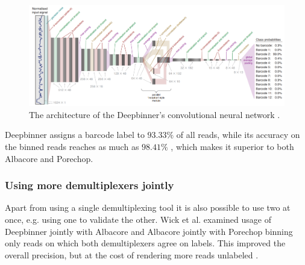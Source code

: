 \begin{figure}
    \centering
    \includegraphics[width=\textwidth]{images/deepbinner_cnn.png}
    \caption[Deepbinner's CNN architecture]{The architecture of the Deepbinner's convolutional neural network \cite{Deepbinner}.}
    \label{fig:deepbinner_cnn}
\end{figure}

Deepbinner assigns a barcode label to $93.33\%$ of all reads, while its accuracy on the binned reads reaches as much as $98.41\%$ \cite{Deepbinner}, which makes it superior to both Albacore and Porechop.

\subsubsection{Using more demultiplexers jointly}
Apart from using a single demultiplexing tool it is also possible to use two at once, e.g. using one to validate the other. Wick et al. examined usage of Deepbinner jointly with Albacore and Albacore jointly with Porechop binning only reads on which both demultiplexers agree on labels. This improved the overall precision, but at the cost of rendering more reads unlabeled \cite{Deepbinner}.